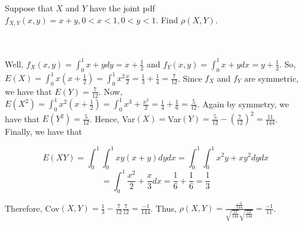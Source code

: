 Suppose that $X$ and $Y$ have the joint pdf $f_{X,Y}(x,y)=x+y, 0<x<1, 0<y<1$. Find $\rho(X,Y)$.\\\\

\begin{solution}\renewcommand{\qedsymbol}{}\ \\
    Well, $f_X(x,y)=\int_0^1x+y dy=x+\frac12$ and $f_Y(x,y)=\int_0^1x+y dx=y+\frac12$. So,
    $E(X)=\int_0^1x(x+\frac12)=\int_0^1x^2\frac{x}{2}=\frac13+\frac14=\frac{7}{12}$. Since $f_X$ and
    $f_Y$ are symmetric, we have that $E(Y)=\frac{7}{12}$. Now,
    $E(X^2)=\int_0^1x^2(x+\frac12)=\int_0^1x^3+\frac{x^2}{2}=\frac14+\frac16=\frac{5}{12}$. Again by
    symmetry, we have that $E(Y^2)=\frac{5}{12}$. Hence,
    Var$(X)=$Var$(Y)=\frac{5}{12}-(\frac{7}{12})^2=\frac{11}{144}$. Finally, we have that
    
    $$E(XY)=\int_0^1\int_0^1xy(x+y) dydx=\int_0^1\int_0^1x^2y+xy^2 dydx$$
    $$=\int_0^1\frac{x^2}{2}+\frac{x}{3}dx=\frac16+\frac16=\frac13$$
    
    Therefore, Cov$(X,Y)=\frac13-\frac{7}{12}\frac{7}{12}=\frac{-1}{144}$. Thus,
    $\rho(X,Y)=\frac{\frac{-1}{144}}{\sqrt{\frac{11}{144}}\sqrt{\frac{11}{144}}}=\frac{-1}{11}$.

\end{solution}